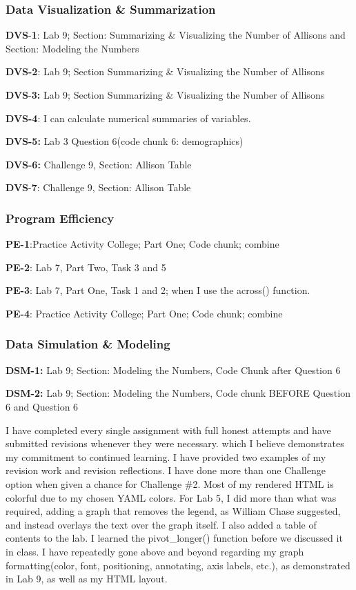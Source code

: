 \documentclass[
  letterpaper,
  DIV=11,
  numbers=noendperiod]{scrartcl}
\begin{document}
\hypertarget{data-visualization-summarization}{%
\subsubsection{Data Visualization \&
Summarization}\label{data-visualization-summarization}}

\textbf{DVS}-\textbf{1}: Lab 9; Section: Summarizing \& Visualizing the
Number of Allisons and Section: Modeling the Numbers

\textbf{DVS-2}: Lab 9; Section Summarizing \& Visualizing the Number of
Allisons

\textbf{DVS}-\textbf{3:} Lab 9; Section Summarizing \& Visualizing the
Number of Allisons

\textbf{DVS-4}: I can calculate numerical summaries of variables.

\textbf{DVS-5:} Lab 3 Question 6(code chunk 6: demographics)

\textbf{DVS-6:} Challenge 9, Section: Allison Table

\textbf{DVS}-\textbf{7}: Challenge 9, Section: Allison Table

\hypertarget{program-efficiency}{%
\subsubsection{Program Efficiency}\label{program-efficiency}}

\textbf{PE-1}:Practice Activity College; Part One; Code chunk; combine

\textbf{PE-2}: Lab 7, Part Two, Task 3 and 5

\textbf{PE-3}: Lab 7, Part One, Task 1 and 2; when I use the across()
function.

\textbf{PE-4}: Practice Activity College; Part One; Code chunk; combine

\hypertarget{data-simulation-modeling}{%
\subsubsection{Data Simulation \&
Modeling}\label{data-simulation-modeling}}

\textbf{DSM-1:} Lab 9; Section: Modeling the Numbers, Code Chunk after
Question 6

\textbf{DSM-2:} Lab 9; Section: Modeling the Numbers, Code chunk BEFORE
Question 6 and Question 6

I have completed every single assignment with full honest attempts and
have submitted revisions whenever they were necessary. which I believe
demonstrates my commitment to continued learning. I have provided two
examples of my revision work and revision reflections. I have done more
than one Challenge option when given a chance for Challenge \#2. Most of
my rendered HTML is colorful due to my chosen YAML colors. For Lab 5, I
did more than what was required, adding a graph that removes the legend,
as William Chase suggested, and instead overlays the text over the graph
itself. I also added a table of contents to the lab. I learned the
pivot\_longer() function before we discussed it in class. I have
repeatedly gone above and beyond regarding my graph formatting(color,
font, positioning, annotating, axis labels, etc.), as demonstrated in
Lab 9, as well as my HTML layout.~
\end{document}

